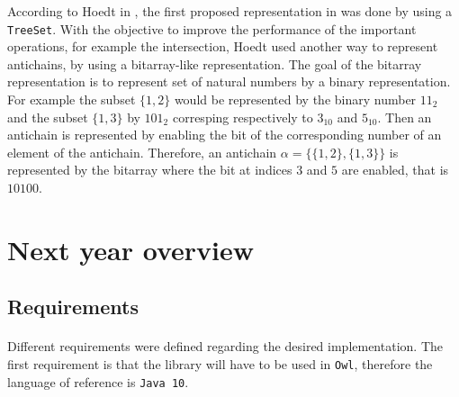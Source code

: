 \documentclass[letterpaper]{article}
\theoremstyle{definition}
\begin{document}
According to Hoedt in
\cite{hoedt}, the first proposed representation
in \cite{causemaecker1} was done by using
a \texttt{TreeSet}. With the objective to improve the performance of
the important operations, for example the intersection, Hoedt used
another way to represent antichains, by using a bitarray-like representation.
The goal of the bitarray representation is to represent set of natural numbers
by a binary representation. For example the subset $\{1, 2\}$ would be
represented by the binary number $11_2$ and the subset $\{1, 3\}$
by $101_2$ corresping respectively to $3_{10}$ and $5_{10}$. Then an antichain
is represented by enabling the bit of the corresponding number of an element
of the antichain. Therefore, an antichain $\alpha = \{\{1, 2\}, \{1, 3\}\}$
is represented by the bitarray  where the bit at indices $3$ and $5$
are enabled, that is $10100$.





\section{Next year overview}

\label{conclusion}

\subsection{Requirements}

\paragraph{}


Different requirements were defined regarding the desired implementation.
The first requirement is that the library will have to be used in
\texttt{Owl}, therefore the language of reference is \texttt{Java 10}.


%
%
%
\end{document}

